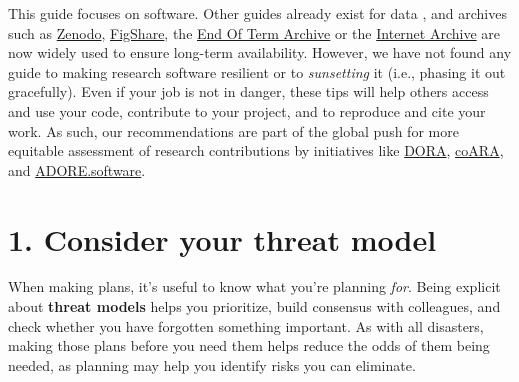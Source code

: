 \documentclass[10pt,letterpaper]{article}
\begin{document}
This guide focuses on software.
Other guides already exist for data \cite{Perkel2023},
and archives such as \href{https://zenodo.org/}{Zenodo},
\href{https://figshare.com/}{FigShare},
the \href{https://eotarchive.org/}{End Of Term Archive}
or the \href{http://archive.org/}{Internet Archive}
are now widely used to ensure long-term availability.
However,
we have not found any guide to making research software resilient
or to \emph{sunsetting} it (i.e., phasing it out gracefully).
Even if your job is not in danger,
these tips will help others access and use your code,
contribute to your project,
and to reproduce and cite your work.
As such,
our recommendations
are part of the global push for more equitable assessment of research contributions
by initiatives like \href{https://sfdora.org/}{DORA}, \href{https://coara.eu/}{coARA}, and \href{https://adore.software/}{ADORE.software}.

\section*{1. Consider your threat model}

When making plans, it's useful to know what you're planning \emph{for}.
Being explicit about \textbf{threat models} helps you prioritize,
build consensus with colleagues,
and check whether you have forgotten something important.
As with all disasters,
making those plans before you need them helps reduce the odds of them being needed,
as planning may help you identify risks you can eliminate.
\end{document}

